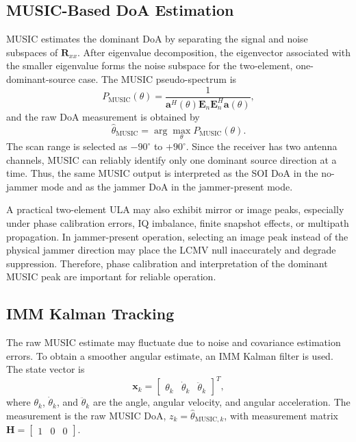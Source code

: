 \documentclass[conference]{IEEEtran}
\begin{document}
\subsection{MUSIC-Based DoA Estimation}
MUSIC estimates the dominant DoA by separating the signal and noise subspaces of $\mathbf{R}_{xx}$. After eigenvalue decomposition, the eigenvector associated with the smaller eigenvalue forms the noise subspace for the two-element, one-dominant-source case. The MUSIC pseudo-spectrum is
\begin{equation}
P_{\mathrm{MUSIC}}(\theta)=
\frac{1}{\mathbf{a}^{H}(\theta)\mathbf{E}_{n}\mathbf{E}_{n}^{H}\mathbf{a}(\theta)},
\label{eq:music}
\end{equation}
and the raw DoA measurement is obtained by
\begin{equation}
\hat{\theta}_{\mathrm{MUSIC}}=\arg\max_{\theta}P_{\mathrm{MUSIC}}(\theta).
\label{eq:music_peak}
\end{equation}
The scan range is selected as $-90^\circ$ to $+90^\circ$. Since the receiver has two antenna channels, MUSIC can reliably identify only one dominant source direction at a time. Thus, the same MUSIC output is interpreted as the SOI DoA in the no-jammer mode and as the jammer DoA in the jammer-present mode.

A practical two-element ULA may also exhibit mirror or image peaks, especially under phase calibration errors, IQ imbalance, finite snapshot effects, or multipath propagation. In jammer-present operation, selecting an image peak instead of the physical jammer direction may place the LCMV null inaccurately and degrade suppression. Therefore, phase calibration and interpretation of the dominant MUSIC peak are important for reliable operation.

\subsection{IMM Kalman Tracking}
The raw MUSIC estimate may fluctuate due to noise and covariance estimation errors. To obtain a smoother angular estimate, an IMM Kalman filter is used. The state vector is
\begin{equation}
\mathbf{x}_k=
\begin{bmatrix}
\theta_k & \dot{\theta}_k & \ddot{\theta}_k
\end{bmatrix}^{T},
\label{eq:imm_state}
\end{equation}
where $\theta_k$, $\dot{\theta}_k$, and $\ddot{\theta}_k$ are the angle, angular velocity, and angular acceleration. The measurement is the raw MUSIC DoA, $z_k=\hat{\theta}_{\mathrm{MUSIC},k}$, with measurement matrix $\mathbf{H}=\begin{bmatrix}1&0&0\end{bmatrix}$.
\end{document}
